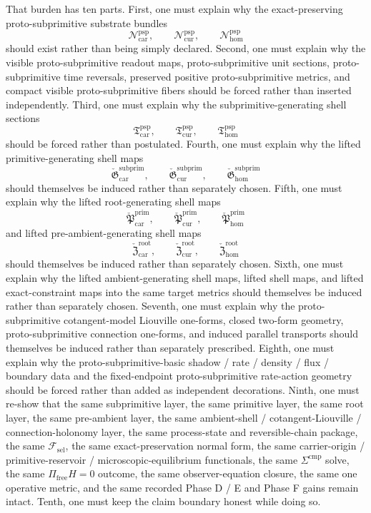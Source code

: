 \documentclass[11pt]{article}
\newcommand{\StemFunctional}{\mathscr F_{\mathrm{sel}}}
\newcommand{\Car}{\mathrm{car}}
\newcommand{\Cur}{\mathrm{cur}}
\newcommand{\Hom}{\mathrm{hom}}
\newcommand{\ProtoSubprimSpace}[1]{\mathcal N_{#1}^{\mathrm{psp}}}
\newcommand{\ProtoSubprimSection}[1]{\mathfrak T_{#1}^{\mathrm{psp}}}
\newcommand{\ProtoSubprimLiftedPrimitive}[1]{\check{\mathfrak G}_{#1}^{\mathrm{subprim}}}
\newcommand{\ProtoSubprimLiftedRoot}[1]{\check{\mathfrak P}_{#1}^{\mathrm{prim}}}
\newcommand{\ProtoSubprimLiftedPreAmbient}[1]{\check{\mathfrak Z}_{#1}^{\mathrm{root}}}
\begin{document}
That burden has ten parts. First, one must explain why the exact-preserving proto-subprimitive substrate bundles
\[
\ProtoSubprimSpace{\Car},\qquad
\ProtoSubprimSpace{\Cur},\qquad
\ProtoSubprimSpace{\Hom}
\]
should exist rather than being simply declared. Second, one must explain why the visible proto-subprimitive readout maps, proto-subprimitive unit sections, proto-subprimitive time reversals, preserved positive proto-subprimitive metrics, and compact visible proto-subprimitive fibers should be forced rather than inserted independently. Third, one must explain why the subprimitive-generating shell sections
\[
\ProtoSubprimSection{\Car},\qquad
\ProtoSubprimSection{\Cur},\qquad
\ProtoSubprimSection{\Hom}
\]
should be forced rather than postulated. Fourth, one must explain why the lifted primitive-generating shell maps
\[
\ProtoSubprimLiftedPrimitive{\Car},\qquad
\ProtoSubprimLiftedPrimitive{\Cur},\qquad
\ProtoSubprimLiftedPrimitive{\Hom}
\]
should themselves be induced rather than separately chosen. Fifth, one must explain why the lifted root-generating shell maps
\[
\ProtoSubprimLiftedRoot{\Car},\qquad
\ProtoSubprimLiftedRoot{\Cur},\qquad
\ProtoSubprimLiftedRoot{\Hom}
\]
and lifted pre-ambient-generating shell maps
\[
\ProtoSubprimLiftedPreAmbient{\Car},\qquad
\ProtoSubprimLiftedPreAmbient{\Cur},\qquad
\ProtoSubprimLiftedPreAmbient{\Hom}
\]
should themselves be induced rather than separately chosen. Sixth, one must explain why the lifted ambient-generating shell maps, lifted shell maps, and lifted exact-constraint maps into the same target metrics should themselves be induced rather than separately chosen. Seventh, one must explain why the proto-subprimitive cotangent-model Liouville one-forms, closed two-form geometry, proto-subprimitive connection one-forms, and induced parallel transports should themselves be induced rather than separately prescribed. Eighth, one must explain why the proto-subprimitive-basic shadow / rate / density / flux / boundary data and the fixed-endpoint proto-subprimitive rate-action geometry should be forced rather than added as independent decorations. Ninth, one must re-show that the same subprimitive layer, the same primitive layer, the same root layer, the same pre-ambient layer, the same ambient-shell / cotangent-Liouville / connection-holonomy layer, the same process-state and reversible-chain package, the same \(\StemFunctional\), the same exact-preservation normal form, the same carrier-origin / primitive-reservoir / microscopic-equilibrium functionals, the same \(\Sigma^{\mathrm{cmp}}\) solve, the same \(\Pi_{\mathrm{free}}H=0\) outcome, the same observer-equation closure, the same one operative metric, and the same recorded Phase D / E and Phase F gains remain intact. Tenth, one must keep the claim boundary honest while doing so.
\end{document}
